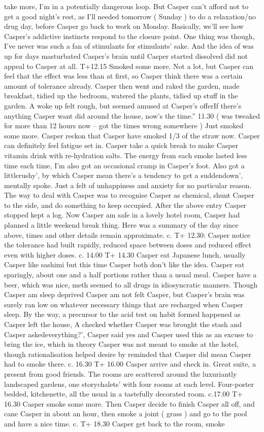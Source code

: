 \documentclass[12pt]{book}
\begin{document}
take more, I'm in a potentially dangerous loop. But Casper can't afford not to get a good night's rest, as I'll needed tomorrow ( Sunday ) to do a relaxation/no drug day, before Casper go back to work on Monday. Basically, we'll see how Casper's addictive instincts respond to the closure point. One thing was though, I've never was such a fan of stimulants for stimulants' sake. And the idea of was up for days masturbated Casper's brain until Casper started dissolved did not appeal to Casper at all. T+12.15 Smoked some more. Not a lot, but Casper can feel that the effect was less than at first, so Casper think there was a certain amount of tolerance already. Casper then went and raked the garden, made breakfast, tidied up the bedroom, watered the plants, tidied up stuff in the garden. A woke up felt rough, but seemed amused at Casper's offerIf there's anything Casper want did around the house, now's the time.'' 11.30 ( was tweaked for more than 12 hours now -- got the times wrong somewhere ) Just smoked some more. Casper reckon that Casper have smoked 1/3 of the straw now. Casper can definitely feel fatigue set in. Casper take a quick break to make Casper vitamin drink with re-hydration salts. The energy from each smoke lasted less time each time, I'm also got an occasional cramp in Casper's foot. Also got a littlerushy', by which Casper mean there's a tendency to get a suddendown', mentally spoke. Just a felt of unhappiness and anxiety for no particular reason. The way to deal with Casper was to recognise Casper as chemical, shunt Casper to the side, and do something to keep occupied. After the above entry Casper stopped kept a log. Now Casper am safe in a lovely hotel room, Casper had planned a little weekend break thing. Here was a summary of the day since above, times and other details remain approximate. c. T+ 12.30: Casper notice the tolerance had built rapidly, reduced space between doses and reduced effect even with higher doses. c. 14.00 T+ 14.30 Casper eat Japanese lunch, usually Casper like sashimi but this time Casper both don't like the idea. Casper eat sparingly, about one and a half portions rather than a usual meal. Casper have a beer, which was nice, meth seemed to all drugs in idiosyncratic manners. Though Casper am sleep deprived Casper am not felt Casper, but Casper's brain was surely ran low on whatever necessary things that are recharged when Casper sleep. By the way, a precursor to the acid test on habit formed happened as Casper left the house, A checked whether Casper was brought the stash and Casper askedeverything?', Casper said yes and Casper used this as an excuse to bring the ice, which in theory Casper was not meant to smoke at the hotel, though rationalisation helped desire by reminded that Casper did mean Casper had to smoke there. c. 16.30 T+ 16.00 Casper arrive and check in. Great suite, a present from good friends. The rooms are scattered around the luxuriantly landscaped gardens, one storychalets' with four rooms at each level. Four-poster bedded, kitchenette, all the usual in a tastefully decorated room. c.17.00 T+ 16.30 Casper smoke some more. Then Casper decide to finish Casper all off, and cane Casper in about an hour, then smoke a joint ( grass ) and go to the pool and have a nice time. c. T+ 18.30 Casper get back to the room, smoke 
\end{document}

